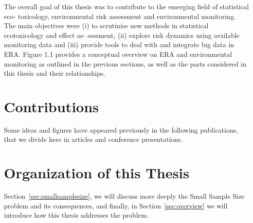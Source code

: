 The overall goal of this thesis was to contribute to the emerging field of statistical eco-
toxicology, environmental risk assessment and environmental monitoring. The main
objectives were (i) to scrutinise new methods in statistical ecotoxicology and effect as-
sessment, (ii) explore risk dynamics using available monitoring data and (iii) provide
tools to deal with and integrate big data in ERA. Figure 1.1 provides a conceptual
overview on ERA and environmental monitoring as outlined in the previous sections,
as well as the parts considered in this thesis and their relationships.

\section{Contributions}
Some ideas and figures have appeared previously in the following publications, that we divide here in articles and conference presentations. 


\begin{refsection}[ownpubs]
	\small
	\nocite{*} %
	\newrefcontext[sorting=ydnt]
	\printbibliography[heading=subbibliography, title={Articles}, type=article]
	\printbibliography[heading=subbibliography, title={Conferences}, type=inproceedings]
	\printbibliography[heading=subbibliography, title={Books}, type=inbook]
\end{refsection}

\section{Organization of this Thesis}

Section~\ref{sec:smallsamplesize}, we will discuss more deeply the Small Sample Size problem and its consequences, 
and finally, in Section~\ref{sec:overview} we will introduce how this thesis addresses the problem. 

